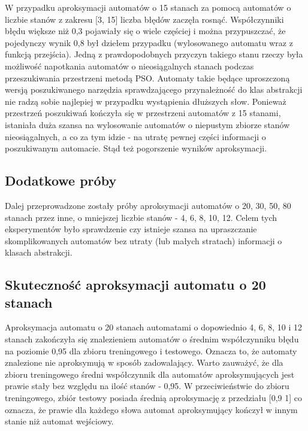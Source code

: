 \documentclass[runningheads,a4paper]{llncs}
\begin{document}
W przypadku aproksymacji automatów o 15 stanach za pomocą automatów o liczbie stanów z zakresu [3, 15] liczba błędów zaczęła rosnąć. Współczynniki błędu większe niż 0,3 pojawiały się o wiele częściej i można przypuszczać, że pojedynczy wynik 0,8 był dziełem przypadku (wylosowanego automatu wraz z funkcją przejścia). Jedną z prawdopodobnych przyczyn takiego stanu rzeczy była możliwość napotkania automatów o nieosiągalnych stanach podczas przeszukiwania przestrzeni metodą PSO. Automaty takie będące uproszczoną wersją poszukiwanego narzędzia sprawdzającego przynależność do klas abstrakcji nie radzą sobie najlepiej w przypadku wystąpienia dłuższych słow. Ponieważ przestrzeń poszukiwań kończyła się w przestrzeni automatów z 15 stanami, istaniała duża szansa na wylosowanie automatów o niepustym zbiorze stanów nieosiągalnych, a co za tym idzie - na utratę pewnej części informacji o poszukiwanym automacie. Stąd też pogorszenie wyników aproksymacji. \\

\FloatBarrier
\subsection{Dodatkowe próby}
Dalej przeprowadzone zostały próby aproksymacji automatów o 20, 30, 50, 80 stanach przez inne, o mniejszej liczbie stanów - 4, 6, 8, 10, 12. Celem tych eksperymentów było sprawdzenie czy istnieje szansa na upraszczanie skomplikowanych automatów bez utraty (lub małych stratach) informacji o klasach abstrakcji. \\

\FloatBarrier
\subsection{Skuteczność aproksymacji automatu o 20 stanach}

Aproksymacja automatu o 20 stanach automatami o dopowiednio 4, 6, 8, 10 i 12 stanach zakończyła się znalezieniem automatów o średnim współczynniku błędu na poziomie 0,95 dla zbioru treningowego i testowego. Oznacza to, że automaty znalezione nie aproksymują w sposób zadowalający. Warto zauważyć, że dla zbioru treningowego średni współczynnik dla automatów aproksymujących jest prawie stały bez względu na ilość stanów - 0,95. W przeciwieństwie do zbioru treningowego, zbiór testowy posiada średnią aproksymację z przedziału [0,9 1] co oznacza, że prawie dla każdego słowa automat aproksymujący kończył w innym stanie niż automat wejściowy.  \\
\end{document}
